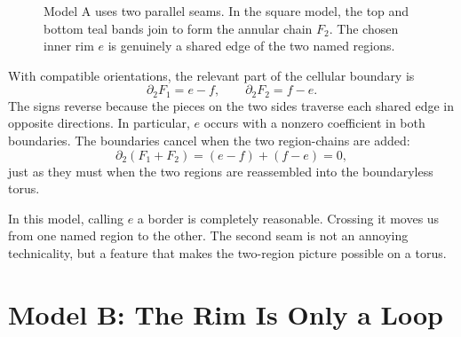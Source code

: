 \documentclass[12pt]{article}
\newcommand{\bd}{\partial}
\begin{document}
\begin{figure}[ht]
\caption{Model A uses two parallel seams.  In the square model, the top and
bottom teal bands join to form the annular chain \(F_2\).  The chosen inner rim
\(e\) is genuinely a shared edge of the two named regions.}
\label{fig:model-a}
\end{figure}

With compatible orientations, the relevant part of the cellular boundary is
\[
  \bd_2F_1=e-f,
  \qquad
  \bd_2F_2=f-e.
\]
The signs reverse because the pieces on the two sides traverse each shared edge
in opposite directions.  In particular, \(e\) occurs with a nonzero coefficient in both
boundaries.  The boundaries cancel when the two region-chains are added:
\[
  \bd_2(F_1+F_2)=(e-f)+(f-e)=0,
\]
just as they must when the two regions are reassembled into the boundaryless
torus.

In this model, calling \(e\) a border is completely reasonable.  Crossing it
moves us from one named region to the other.  The second seam is not an annoying
technicality, but a feature that makes the two-region picture possible on a
torus.

\section{Model B: The Rim Is Only a Loop}
\end{document}

